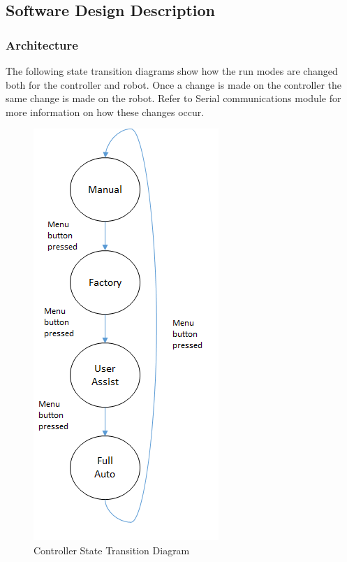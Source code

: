 \documentclass[MTRX3700report.tex]{subfiles}
\begin{document}
\subsection{Software Design Description}
\subsubsection{Architecture}

The following state transition diagrams show how the run modes are changed both for the controller and robot. Once a change is made on the controller the same change is made on the robot. Refer to Serial communications module for more information on how these changes occur. 
	\begin{figure}[h]
		\includegraphics[scale=0.5]{controller_std.png}
		\centering
		\caption{Controller State Transition Diagram}
	\end{figure}
	
\end{document}
